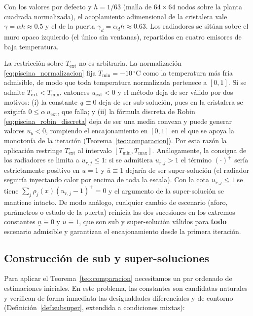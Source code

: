 \begin{itemize}
Con los valores por defecto y $h = 1/63$ (malla de $64 \times 64$ nodos sobre la
planta cuadrada normalizada), el acoplamiento adimensional de la cristalera vale
$\gamma = \alpha h \approx 0.5$ y el de la puerta $\gamma_d = \alpha_d h
\approx 0.63$. Los radiadores se sitúan sobre el muro opaco izquierdo (el único
sin ventanas), repartidos en cuatro emisores de baja temperatura.

La restricción sobre $T_{\mathrm{ext}}$ no es arbitraria. La normalización
\eqref{eq:piscina_normalizacion} fija $T_{\min} = -10\,^{\circ}\mathrm{C}$ como la
temperatura más fría admisible, de modo que toda temperatura normalizada
pertenece a $[0,1]$. Si se admite $T_{\mathrm{ext}} < T_{\min}$, entonces
$u_{\mathrm{ext}} < 0$ y el método deja de ser válido por dos motivos: (i) la
constante $\underline{u} \equiv 0$ deja de ser sub-solución, pues en la
cristalera se exigiría $0 \leq \alpha\,u_{\mathrm{ext}}$, que falla; y (ii) la
fórmula discreta de Robin \eqref{eq:piscina_robin_discreta} deja de ser una media
convexa y puede generar valores $u_b < 0$, rompiendo el encajonamiento en $[0,1]$
en el que se apoya la monotonía de la iteración (Teorema~\ref{teo:comparacion}).
Por esta razón la aplicación restringe $T_{\mathrm{ext}}$ al intervalo
$[T_{\min}, T_{\max}]$. Análogamente, la consigna de los radiadores se limita a
$u_{r,j} \le 1$: si se admitiera $u_{r,j} > 1$ el término $(\cdot)^{+}$ sería
estrictamente positivo en $u = 1$ y $\overline{u} \equiv 1$ dejaría de ser
super-solución (el radiador seguiría inyectando calor por encima de toda la
escala). Con la cota $u_{r,j} \le 1$ se tiene
$\sum_j \rho_j(x)(u_{r,j} - 1)^{+} = 0$ y el argumento de la super-solución se
mantiene intacto. De modo análogo, cualquier cambio de escenario (aforo,
parámetros o estado de la puerta) reinicia las dos sucesiones en los extremos
constantes $\underline{u} \equiv 0$ y $\overline{u} \equiv 1$, que son sub y
super-solución válidos para \textbf{todo} escenario admisible y garantizan el
encajonamiento desde la primera iteración.

\subsection{Construcción de sub y super-soluciones}

Para aplicar el Teorema~\ref{teo:comparacion} necesitamos un par ordenado de
estimaciones iniciales. En este problema, las constantes son candidatas
naturales y verifican de forma inmediata las desigualdades diferenciales y de
contorno (Definición~\ref{def:subsuper}, extendida a condiciones mixtas):


\end{itemize}
